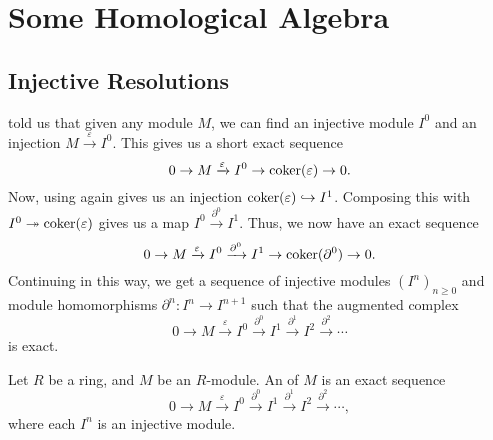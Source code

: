 \documentclass[12pt]{article}
\begin{document}
\coverpage
\thispagestyle{empty}
\updated{\today}
\thispagestyle{empty}
\tableofcontents
\pagestyle{fancy}
\setcounter{page}{1}
\setcounter{section}{-1}




\section{Some Homological Algebra}

\subsection{Injective Resolutions}

 told us that given any module $M$, we can find an injective module $I^{0}$ and an injection $M \xrightarrow{\varepsilon} I^{0}$. This gives us a short exact sequence
\begin{equation*} 
	0 \to M \xrightarrow{\varepsilon} I^{0} \to \operatorname{coker}(\varepsilon) \to 0.
\end{equation*}
Now, using  again gives us an injection $\operatorname{coker}(\varepsilon) \hookrightarrow I^{1}$. Composing this with $I^{0} \twoheadrightarrow \operatorname{coker}(\varepsilon)$ gives us a map $I^{0} \xrightarrow{\partial^{0}} I^{1}$. Thus, we now have an exact sequence
\begin{equation*} 
	0 \to M \xrightarrow{\varepsilon} I^{0} \xrightarrow{\partial^{0}} I^{1} \to \operatorname{coker}(\partial^{0}) \to 0.
\end{equation*}
Continuing in this way, we get a sequence of injective modules $(I^{n})_{n \ge 0}$ and module homomorphisms $\partial^{n} : I^{n} \to I^{n + 1}$ such that the augmented complex
\begin{equation*} 
	0 \to M \xrightarrow{\varepsilon} I^{0} \xrightarrow{\partial^{0}} I^{1} \xrightarrow{\partial^{1}} I^{2} \xrightarrow{\partial^{2}} \cdots	
\end{equation*}
is exact.

\begin{defn}
	Let $R$ be a ring, and $M$ be an $R$-module. An  of $M$ is an exact sequence
	\begin{equation*} 
		0 \to M \xrightarrow{\varepsilon} I^{0} \xrightarrow{\partial^{0}} I^{1} \xrightarrow{\partial^{1}} I^{2} \xrightarrow{\partial^{2}} \cdots,
	\end{equation*}
	where each $I^{n}$ is an injective module.
\end{defn}
\end{document}
